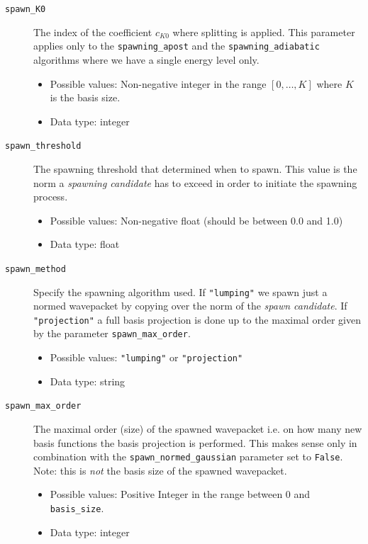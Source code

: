 \documentclass[a4paper,10pt]{report}
\begin{document}
\begin{description}
  \item[\texttt{spawn\_K0}] The index of the coefficient $c_{K0}$ where splitting
  is applied. This parameter applies only to the \texttt{spawning\_apost} and the
  \texttt{spawning\_adiabatic} algorithms where we have a single energy level only.
  \begin{itemize}
    \item Possible values: Non-negative integer in the range $\left[0, \ldots, K\right]$ where $K$
          is the basis size.
    \item Data type: integer
  \end{itemize}

  \item[\texttt{spawn\_threshold}] The spawning threshold that determined when to spawn.
  This value is the norm a \emph{spawning candidate} has to exceed in order to
  initiate the spawning process.
  \begin{itemize}
    \item Possible values: Non-negative float (should be between 0.0 and 1.0)
  \item Data type: float
  \end{itemize}

  \item[\texttt{spawn\_method}] Specify the spawning algorithm used.
  If \texttt{"lumping"} we spawn just a normed wavepacket by copying over the norm
  of the \emph{spawn candidate}. If \texttt{"projection"} a full basis projection is done
  up to the maximal order given by the parameter \texttt{spawn\_max\_order}.
  \begin{itemize}
    \item Possible values: \texttt{"lumping"} or \texttt{"projection"}
    \item Data type: string
  \end{itemize}

  \item[\texttt{spawn\_max\_order}] The maximal order (size) of the spawned wavepacket
  i.e. on how many new basis functions the basis projection is performed.
  This makes sense only in combination with the \texttt{spawn\_normed\_gaussian}
  parameter set to \texttt{False}. Note: this is \emph{not} the basis size of the
  spawned wavepacket.
  \begin{itemize}
    \item Possible values: Positive Integer in the range between 0 and \texttt{basis\_size}.
    \item Data type: integer
  \end{itemize}


\end{description}
\end{document}
